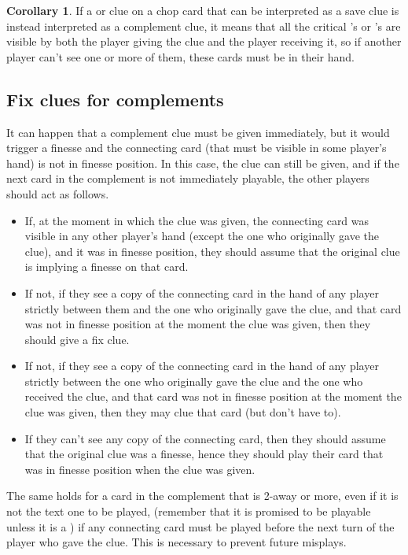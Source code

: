 \documentclass[a4paper]{article}
\theoremstyle{plain}
\theoremstyle{definition}
\newtheorem{corollary}[theorem]{Corollary}
\begin{document}
\begin{corollary}
	If a  or  clue on a chop card that can be interpreted as a save clue is instead interpreted as a complement clue, it means that all the critical 's or 's are visible by both the player giving the clue and the player receiving it, so if another player can't see one or more of them, these cards must be in their hand.
\end{corollary}

\subsection{Fix clues for complements}

It can happen that a complement clue must be given immediately, but it would trigger a finesse and the connecting card (that must be visible in some player's hand) is not in finesse position. In this case, the clue can still be given, and if the next card in the complement is not immediately playable, the other players should act as follows.

\begin{itemize}
	\item If, at the moment in which the clue was given, the connecting card was visible in any other player's hand (except the one who originally gave the clue), and it was in finesse position, they should assume that the original clue is implying a finesse on that card.
	\item If not, if they see a copy of the connecting card in the hand of any player strictly between them and the one who originally gave the clue, and that card was not in finesse position at the moment the clue was given, then they should give a fix clue.
	\item If not, if they see a copy of the connecting card in the hand of any player strictly between the one who originally gave the clue and the one who received the clue, and that card was not in finesse position at the moment the clue was given, then they may clue that card (but don't have to).
	\item If they can't see any copy of the connecting card, then they should assume that the original clue was a finesse, hence they should play their card that was in finesse position when the clue was given.
\end{itemize}

The same holds for a card in the complement that is 2-away or more, even if it is not the text one to be played, (remember that it is promised to be playable unless it is a ) if any connecting card must be played before the next turn of the player who gave the clue. This is necessary to prevent future misplays.
\end{document}
